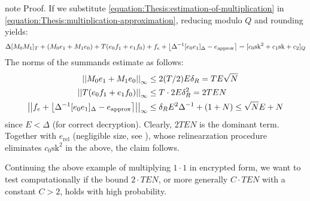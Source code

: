 \documentclass[letterpaper,10pt,english]{jupyterBook}
\begin{document}
\begin{sphinxadmonition}{note}
\sphinxAtStartPar
Proof. If we substitute \eqref{equation:Thesis:estimation-of-multiplication} in \eqref{equation:Thesis:multiplication-approximation}, reducing modulo \(Q\) and rounding yields:
\begin{equation*}
\begin{split}\Delta [M_0M_1]_T + (M_0e_1+M_1e_0) + T(e_0f_1+e_1f_0) + f_e + \left\lfloor \Delta^{-1}[e_0e_1]_\Delta - e_{\text{approx}} \right\rceil
= [c_0\mathrm{sk}^2 + c_1\mathrm{sk} + c_2]_Q\end{split}
\end{equation*}
\sphinxAtStartPar
The norms of the summands estimate as follows:
\begin{equation*}
\begin{split}\begin{split}
\left\lvert\left\lvert M_0e_1+M_1e_0 \right\rvert\right\rvert_\infty &\le 2 (T/2) E \delta_R = TE\sqrt{N} \\
\left\lvert\left\lvert T(e_0f_1+e_1f_0) \right\rvert\right\rvert_\infty &\le T \cdot 2 E \delta_R^2 = 2TEN \\
\left\lvert\left\lvert f_e + \left\lfloor \Delta^{-1}[e_0e_1]_\Delta - e_{\text{approx}} \right\rceil \right\rvert\right\rvert_\infty &\le \delta_R E^2 \Delta^{-1} + (1 + N) \le \sqrt{N}E + N
\end{split}\end{split}
\end{equation*}
\sphinxAtStartPar
since \(E < \Delta\) (for correct decryption).
Clearly, \(2TEN\) is the dominant term.
Together with \(e_{\text{rel}}\) (negligible size, see {\hyperref[\detokenize{Thesis:relinearization-error}]{}}), whose relinearzation procedure eliminates \(c_0\mathrm{sk}^2\) in the above, the claim follows.
\end{sphinxadmonition}

\sphinxAtStartPar
Continuing the above example of multiplying \(1\cdot 1\) in encrypted form, we want to test computationally if the bound \(2\cdot TEN\), or more generally \(C\cdot TEN\) with a constant \(C > 2\), holds with high probability.
\end{document}

